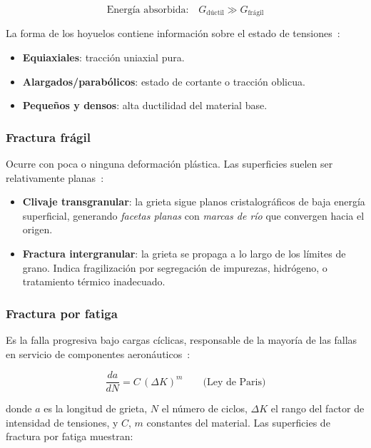 \documentclass[12pt,a4paper]{article}
\begin{document}
\begin{equation}
	\text{Energía absorbida:}\quad G_{\mathrm{dúctil}} \gg G_{\mathrm{frágil}}
	\label{eq:energia_fractura}
\end{equation}

La forma de los hoyuelos contiene información sobre el estado de
tensiones~\cite{hull1999}:

\begin{itemize}
	\item \textbf{Equiaxiales}: tracción uniaxial pura.
	\item \textbf{Alargados/parabólicos}: estado de cortante o tracción
	      oblicua.
	\item \textbf{Pequeños y densos}: alta ductilidad del material base.
\end{itemize}

\subsubsection{Fractura frágil}

Ocurre con poca o ninguna deformación plástica.  Las superficies suelen
ser relativamente planas~\cite{anderson2017}:

\begin{itemize}
	\item \textbf{Clivaje transgranular}: la grieta sigue planos
	      cristalográficos de baja energía superficial, generando \emph{facetas
		      planas} con \emph{marcas de río} que convergen hacia el origen.
	\item \textbf{Fractura intergranular}: la grieta se propaga a lo largo de
	      los límites de grano.  Indica fragilización por segregación de
	      impurezas, hidrógeno, o tratamiento térmico inadecuado.
\end{itemize}

\subsubsection{Fractura por fatiga}

Es la falla progresiva bajo cargas cíclicas, responsable de la
mayoría de las fallas en servicio de componentes
aeronáuticos~\cite{suresh1998,dowling2013}:

\begin{equation}
	\frac{da}{dN} = C\,(\Delta K)^m \qquad\text{(Ley de Paris)}
	\label{eq:paris}
\end{equation}

donde $a$ es la longitud de grieta, $N$ el número de ciclos, $\Delta K$ el
rango del factor de intensidad de tensiones, y $C$, $m$ constantes del
material.  Las superficies de fractura por fatiga muestran:
\end{document}

